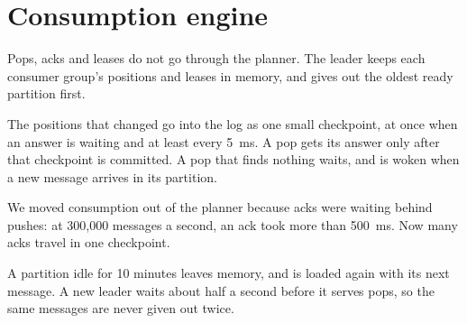 
\section{Consumption engine}

Pops, acks and leases do not go through the planner. The leader keeps each consumer group's
positions and leases in memory, and gives out the oldest ready partition first.

The positions that changed go into the log as one small checkpoint, at once when an answer is
waiting and at least every 5~ms. A pop gets its answer only after that checkpoint is committed. A
pop that finds nothing waits, and is woken when a new message arrives in its partition.


We moved consumption out of the planner because acks were waiting behind pushes: at 300,000
messages a second, an ack took more than 500~ms. Now many acks travel in one checkpoint.

A partition idle for 10 minutes leaves memory, and is loaded again with its next message. A new
leader waits about half a second before it serves pops, so the same messages are never given out
twice.
